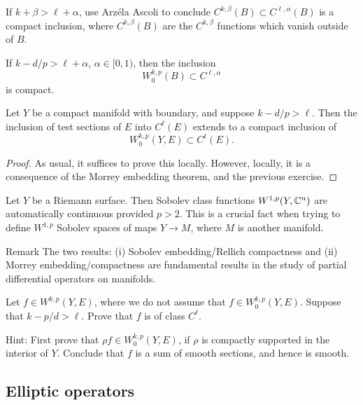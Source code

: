 \begin{xca}
  If $k+\beta>\ell+\alpha$, use Arz\'ela Ascoli to conclude $C^{k,\beta}(B)\subset C^{\ell,\alpha}(B)$ is a compact inclusion, where $C^{k,\beta}(B)$ are the $C^{k,\beta}$ functions which vanish outside of $B$.
\end{xca}
\begin{xca}
  If $k-d/p>\ell+\alpha$, $\alpha\in [0,1)$, then the inclusion
  \begin{equation*}
    W^{k,p}_{0}(B)\subset C^{\ell,\alpha}
  \end{equation*}
  is compact. 
\end{xca}
\begin{cor}
  Let $Y$ be a compact manifold with boundary, and suppose $k-d/p>\ell$. Then the inclusion of test sections of $E$ into $C^{\ell}(E)$ extends to a compact inclusion of $$W^{k,p}_{0}(Y,E)\subset C^{\ell}(E).$$
\end{cor}
\begin{proof}
  As usual, it suffices to prove this locally. However, locally, it is a consequence of the Morrey embedding theorem, and the previous exercise.
\end{proof}
\begin{example}
  Let $Y$ be a Riemann surface. Then Sobolev class functions $W^{1,p}(Y,\mathbb{C}^{n})$ are automatically continuous provided $p>2$. This is a crucial fact when trying to define $W^{1,p}$ Sobolev spaces of maps $Y\to M$, where $M$ is another manifold.
\end{example}
\begin{clear}{Remark}
  The two results: (i) Sobolev embedding/Rellich compactness and (ii) Morrey embedding/compactness are fundamental results in the study of partial differential operators on manifolds.
\end{clear}
\begin{xca}
  Let $f\in W^{k,p}(Y,E)$, where we do not assume that $f\in W^{k,p}_{0}(Y,E)$. Suppose that $k-p/d>\ell$. Prove that $f$ is of class $C^{\ell}$.

  Hint: First prove that $\rho f\in W^{k,p}_{0}(Y,E)$, if $\rho$ is compactly supported in the interior of $Y$. Conclude that $f$ is a sum of smooth sections, and hence is smooth. 
\end{xca}
\clearpage

\subsection*{Elliptic operators}

